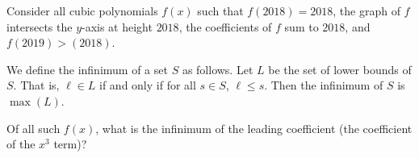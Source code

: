 Consider all cubic polynomials $f(x)$ such that $f(2018)=2018$,  the graph of $f$ intersects the $y$-axis at height $2018$,  the coefficients of $f$ sum to $2018$,  and $f(2019)>(2018)$.

We define the infinimum of a set $S$ as follows. Let $L$ be the set of lower bounds of $S$. That is, $\ell\in L$ if and only if for all $s\in S$,  $\ell\leq s$. Then the infinimum of $S$ is $\max(L)$.

Of all such $f(x)$,  what is the infinimum of the leading coefficient (the coefficient of the $x^3$ term)?